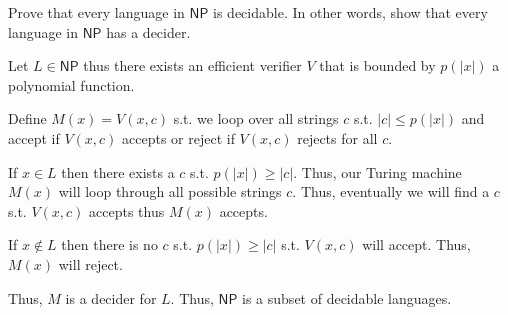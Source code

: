 \documentclass[12pt, letterpaper]{article}
\newcommand{\NP}{\mathsf{NP}}
\begin{document}
\begin{subproblem}{}
    Prove that every language in $\NP$ is decidable. In other words, show that every language in $\NP$ has a decider. 
\end{subproblem}
\begin{problemproof}
    Let $L \in \NP$ thus there exists an efficient verifier $V$ that is bounded by $p(|x|)$ a polynomial function.

    Define $M(x)=V(x,c)$ s.t. we loop over all strings $c$ s.t. $|c| \leq p(|x|)$ and accept if $V(x,c)$ accepts or reject if $V(x,c)$ rejects for all $c$.

    If $x  \in L$ then there exists a $c$ s.t. $p(|x|)\geq|c|$. Thus, our Turing machine $M(x)$ will loop through all possible strings $c$. Thus, eventually we will find a $c$ s.t. $V(x,c)$ accepts thus $M(x)$ accepts.

    If $x \notin L$ then there is no $c$ s.t. $p(|x|) \geq |c|$ s.t. $V(x,c)$ will accept. Thus, $M(x)$ will reject.

    Thus, $M$ is a decider for $L$. Thus, $\NP$ is a subset of decidable languages.
\end{problemproof}
\end{document}
